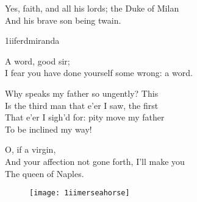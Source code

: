 	
\begin{verse_speech}[Ferdinand] 
Yes, faith, and all his lords; the Duke of Milan\\
And his brave son being twain.
\end{verse_speech}


\begin{pictures} %
	\begin{bwbigpic}
		[\picwidth]
		{1iiferdmiranda}
		{}
	\end{bwbigpic}
\end{pictures}



\begin{verse_speech}[Prospero] 
A word, good sir;\\
I fear you have done yourself some wrong: a word.
\end{verse_speech}

\begin{verse_speech}[Miranda] 
Why speaks my father so ungently? This\\
Is the third man that e'er I saw, the first\\
That e'er I sigh'd for: pity move my father\\
To be inclined my way!
\end{verse_speech}

\begin{verse_speech}[Ferdinand] 
O, if a virgin,\\
And your affection not gone forth, I'll make you\\
The queen of Naples.
\end{verse_speech}

\begin{figure}[tb]
\centering
\texttt{[image: 1iimerseahorse]}
\end{figure}


